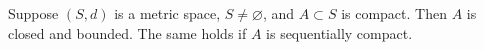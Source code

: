 Suppose $(S, d)$ is a metric space, $S \neq \varnothing$, and $A \subset S$ is compact. Then $A$ is closed and bounded. The same holds if $A$ is sequentially compact.
